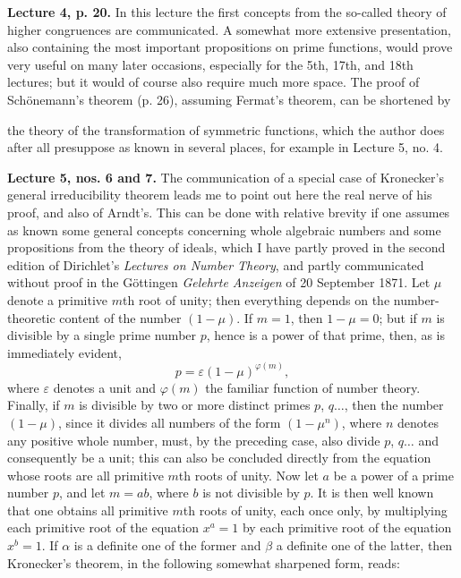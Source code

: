 \documentclass[11pt]{article}
\newcommand{\origpage}[1]{\par\vspace{0.25em}\noindent{\footnotesize\itshape [Printed page #1]}\par\vspace{0.25em}}
\begin{document}
\textbf{Lecture 4, p. 20.} In this lecture the first concepts from the so-called theory of higher congruences are communicated. A somewhat more extensive presentation, also containing the most important propositions on prime functions, would prove very useful on many later occasions, especially for the 5th, 17th, and 18th lectures; but it would of course also require much more space. The proof of Schönemann's theorem (p. 26), assuming Fermat's theorem, can be shortened by

\origpage{412}
the theory of the transformation of symmetric functions, which the author does after all presuppose as known in several places, for example in Lecture 5, no. 4.

\textbf{Lecture 5, nos. 6 and 7.} The communication of a special case of Kronecker's general irreducibility theorem leads me to point out here the real nerve of his proof, and also of Arndt's. This can be done with relative brevity if one assumes as known some general concepts concerning whole algebraic numbers and some propositions from the theory of ideals, which I have partly proved in the second edition of Dirichlet's \textit{Lectures on Number Theory}, and partly communicated without proof in the Göttingen \textit{Gelehrte Anzeigen} of 20 September 1871. Let $\mu$ denote a primitive $m$th root of unity; then everything depends on the number-theoretic content of the number $(1-\mu)$. If $m=1$, then $1-\mu=0$; but if $m$ is divisible by a single prime number $p$, hence is a power of that prime, then, as is immediately evident,
\[
 p=\varepsilon(1-\mu)^{\varphi(m)},
\]
where $\varepsilon$ denotes a unit and $\varphi(m)$ the familiar function of number theory. Finally, if $m$ is divisible by two or more distinct primes $p$, $q\ldots$, then the number $(1-\mu)$, since it divides all numbers of the form $(1-\mu^n)$, where $n$ denotes any positive whole number, must, by the preceding case, also divide $p$, $q\ldots$ and consequently be a unit; this can also be concluded directly from the equation whose roots are all primitive $m$th roots of unity. Now let $a$ be a power of a prime number $p$, and let $m=ab$, where $b$ is not divisible by $p$. It is then well known that one obtains all primitive $m$th roots of unity, each once only, by multiplying each primitive root of the equation $x^a=1$ by each primitive root of the equation $x^b=1$. If $\alpha$ is a definite one of the former and $\beta$ a definite one of the latter, then Kronecker's theorem, in the following somewhat sharpened form, reads:
\end{document}
